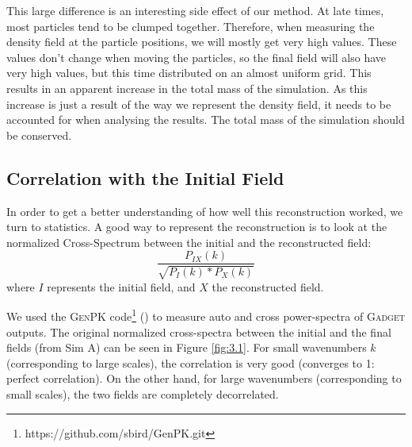 This large difference is an interesting side effect of our method. At late times, most particles tend to be clumped together. Therefore, when measuring the density field at the particle positions, we will mostly get very high values. These values don't change when moving the particles, so the final field will also have very high values, but this time distributed on an almost uniform grid. This results in an apparent increase in the total mass of the simulation. As this increase is just a result of the way we represent the density field, it needs to be accounted for when analysing the results. The total mass of the simulation should be conserved.

\subsection{Correlation with the Initial Field}

In order to get a better understanding of how well this reconstruction worked, we turn to statistics. A good way to represent the reconstruction  is to look at the normalized Cross-Spectrum between the initial and the reconstructed field: $$ \frac{P_{IX}(k)}{\sqrt{P_I(k) * P_X(k)}} $$ where $I$ represents the initial field, and $X$ the reconstructed field. 

We used the \textsc{GenPK} code\footnote{https://github.com/sbird/GenPK.git} (\cite{2017ascl.soft06006B}) to measure auto and cross power-spectra of \textsc{Gadget} outputs. The original normalized cross-spectra between the initial and the final fields (from Sim A) can be seen in Figure \ref{fig:3.1}. For small wavenumbers $k$ (corresponding to large scales), the correlation is very good (converges to 1: perfect correlation). On the other hand, for large wavenumbers (corresponding to small scales), the two fields are completely decorrelated. 


